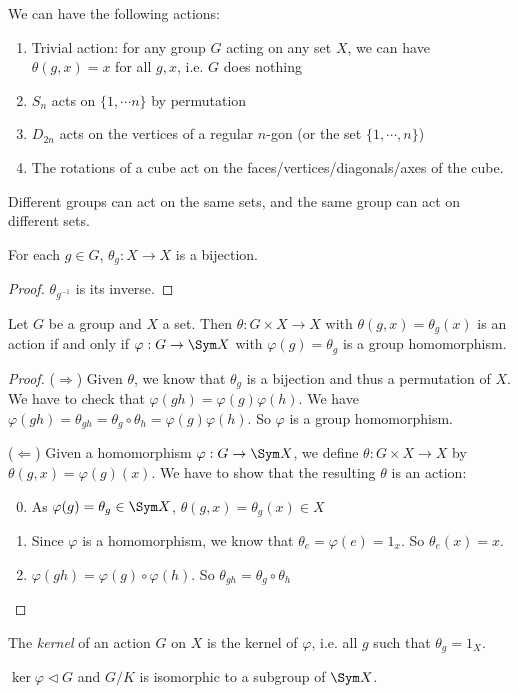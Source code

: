 \documentclass[a4paper]{article}
\begin{document}
  \begin{eg}
    We can have the following actions:
    \begin{enumerate}
      \item Trivial action: for any group $G$ acting on any set $X$, we can have $\theta(g, x) = x$ for all $g, x$, i.e. $G$ does nothing
      \item $S_n$ acts on $\{1, \cdots n\}$ by permutation
      \item $D_{2n}$ acts on the vertices of a regular $n$-gon (or the set $\{1, \cdots, n\}$)
      \item The rotations of a cube act on the faces/vertices/diagonals/axes of the cube.
    \end{enumerate}
  \end{eg}
  \note Different groups can act on the same sets, and the same group can act on different sets.

  \begin{lemma}
    For each $g\in G$, $\theta_g: X\to X$ is a bijection.
  \end{lemma}

  \begin{proof}
    $\theta_{g^{-1}}$ is its inverse.
  \end{proof}

  \begin{prop}
    Let $G$ be a group and $X$ a set. Then $\theta: G\times X\to X$ with $\theta(g, x) = \theta_g(x)$ is an action if and only if $\varphi: G\to \Sym X$ with $\varphi(g) = \theta_g$ is a group homomorphism.
  \end{prop}

  \begin{proof}
    ($\Rightarrow$) Given $\theta$, we know that $\theta_g$ is a bijection and thus a permutation of $X$. We have to check that $\varphi(gh) = \varphi(g)\varphi(h)$. We have $\varphi(gh) = \theta_{gh} = \theta_g\circ \theta_h = \varphi(g)\varphi(h)$. So $\varphi$ is a group homomorphism.

    ($\Leftarrow$) Given a homomorphism $\varphi: G\to \Sym X$, we define $\theta: G\times X\to X$ by $\theta(g, x) = \varphi(g)(x)$. We have to show that the resulting $\theta$ is an action:
    \begin{enumerate}[label=\arabic{*}.]
        \setcounter{enumi}{-1}
      \item As $\varphi(g) = \theta_g\in \Sym X$, $\theta(g, x) = \theta_g (x)\in X$
      \item Since $\varphi$ is a homomorphism, we know that $\theta_e  = \varphi(e) = 1_x$. So $\theta_e(x) = x$.
      \item $\varphi (gh) = \varphi(g)\circ \varphi(h)$. So $\theta_{gh} = \theta_g\circ \theta_h$
    \end{enumerate}
  \end{proof}
  \begin{defi}
    The \emph{kernel} of an action $G$ on $X$ is the kernel of $\varphi$, i.e. all $g$ such that $\theta_g = 1_X$.
  \end{defi}
  \note $\ker \varphi\lhd G$ and $G/K$ is isomorphic to a subgroup of $\Sym X$.
\end{document}
